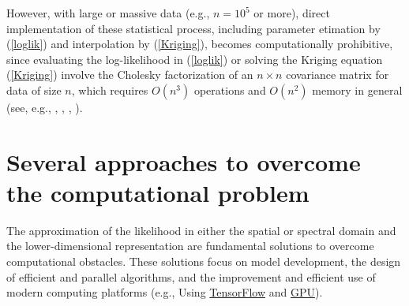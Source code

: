 \documentclass[
12pt, %
a4paper, %
oneside, %
headinclude,footinclude, %
BCOR5mm, %
]{scrartcl}
\begin{document}
However, with large or massive data (e.g., $n = 10^5$ or more), direct implementation of these statistical process, including parameter etimation by (\ref{loglik}) and interpolation by (\ref{Kriging}), becomes computationally prohibitive, since evaluating the log-likelihood in (\ref{loglik}) or solving the Kriging equation (\ref{Kriging}) involve the Cholesky factorization of an $n \times n$ covariance matrix for data of size $n$, which requires $O(n^3)$ operations and $O(n^2)$ memory in general (see, e.g., \href{https://chenyw68.github.io/Literature/[2012]Advances and Challenges in Space-time Modelling of Natural Events.pdf}{\cite{porcu2012advances}}, \href{https://chenyw68.github.io/Literature/[2012]A full scale approximation of covariance functions for large spatial data sets.pdf}{\cite{sang2012full}}, \href{https://chenyw68.github.io/Literature/[2018]A case study competition among methods for analyzing large spatial data.pdf}{\cite{heaton2019case}}, \href{https://chenyw68.github.io/Literature/[2020]A Fused Gaussian Process Model for Very Large Spatial Data.pdf}{\cite{ma2020fused}}).

\section{Several approaches to overcome the computational problem}
The \textcolor[rgb]{0.50,0.50,0.50}{approximation of the likelihood in either the spatial or spectral domain} and the \textcolor[rgb]{0.50,0.50,0.50}{lower-dimensional representation} are fundamental solutions to overcome computational obstacles. These solutions focus on model development, the design of efficient and parallel algorithms, and the improvement and efficient use of modern computing platforms (e.g., Using \href{https://hpc.niasra.uow.edu.au/azm/Spatial_GPUs.html}{TensorFlow} and \href{https://github.com/cdeterman/gpuR}{GPU}).
\end{document}
